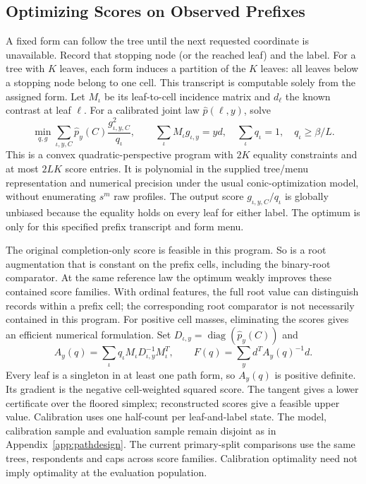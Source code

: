 \subsection{Optimizing Scores on Observed Prefixes}\label{app:prefix}
A fixed form can follow the tree until the next requested coordinate is unavailable. Record that stopping node (or the reached leaf) and the label. For a tree with $K$ leaves, each form induces a partition of the $K$ leaves: all leaves below a stopping node belong to one cell. This transcript is computable solely from the assigned form. Let $M_\iota$ be its leaf-to-cell incidence matrix and $d_\ell$ the known contrast at leaf $\ell$. For a calibrated joint law $\widehat p(\ell,y)$, solve
\begin{equation}\label{eq:mainprefix}
 \min_{q,g}\sum_{\iota,y,C}\widehat p_y(C)\frac{g_{\iota,y,C}^2}{q_\iota},
 \qquad \sum_\iota M_\iota g_{\iota,y}=y d,\quad
 \sum_\iota q_\iota=1,\quad q_\iota\ge\beta/L.
\end{equation}
This is a convex quadratic-perspective program with $2K$ equality constraints and at most $2LK$ score entries. It is polynomial in the supplied tree/menu representation and numerical precision under the usual conic-optimization model, without enumerating $s^m$ raw profiles. The output score $g_{\iota,y,C}/q_\iota$ is globally unbiased because the equality holds on every leaf for either label. The optimum is only for this specified prefix transcript and form menu.

The original completion-only score is feasible in this program. So is a root augmentation that is constant on the prefix cells, including the binary-root comparator. At the same reference law the optimum weakly improves these contained score families. With ordinal features, the full root value can distinguish records within a prefix cell; the corresponding root comparator is not necessarily contained in this program. For positive cell masses, eliminating the scores gives an efficient numerical formulation. Set $D_{\iota,y}=\operatorname{diag}(\widehat p_y(C))$ and
\[
 A_y(q)=\sum_\iota q_\iota M_\iota D_{\iota,y}^{-1}M_\iota^T,\qquad
 F(q)=\sum_y d^T A_y(q)^{-1}d.
\]
Every leaf is a singleton in at least one path form, so $A_y(q)$ is positive definite. Its gradient is the negative cell-weighted squared score. The tangent gives a lower certificate over the floored simplex; reconstructed scores give a feasible upper value. Calibration uses one half-count per leaf-and-label state. The model, calibration sample and evaluation sample remain disjoint as in Appendix~\ref{app:pathdesign}. The current primary-split comparisons use the same trees, respondents and caps across score families. Calibration optimality need not imply optimality at the evaluation population.

